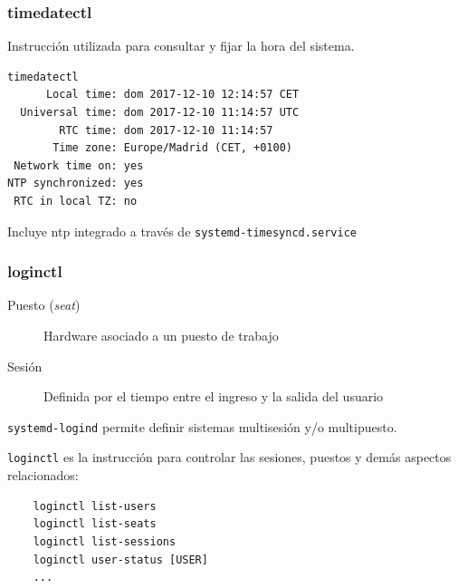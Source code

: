 \documentclass[aspectratio=169]{beamer}
\begin{document}
\begin{frame}[fragile]
  \frametitle{timedatectl}
  Instrucción utilizada para consultar y fijar la hora del sistema.
  \begin{lstlisting}
timedatectl 
      Local time: dom 2017-12-10 12:14:57 CET
  Universal time: dom 2017-12-10 11:14:57 UTC
        RTC time: dom 2017-12-10 11:14:57
       Time zone: Europe/Madrid (CET, +0100)
 Network time on: yes
NTP synchronized: yes
 RTC in local TZ: no    
  \end{lstlisting}
  Incluye ntp integrado a través de \texttt{systemd-timesyncd.service}
\end{frame}

\begin{frame}[fragile]
  \frametitle{loginctl}
  \begin{description}
  \item[Puesto (\textit{seat})] Hardware asociado a un puesto de trabajo
  \item[Sesión] Definida por el tiempo entre el ingreso y la salida del usuario
  \end{description}
  \texttt{systemd-logind} permite definir sistemas multisesión y/o multipuesto.\par
  \texttt{loginctl} es la instrucción para controlar las sesiones, puestos y demás aspectos relacionados:
  \begin{lstlisting}
    loginctl list-users
    loginctl list-seats
    loginctl list-sessions
    loginctl user-status [USER]
    ...
  \end{lstlisting}
\end{frame}
\end{document}
